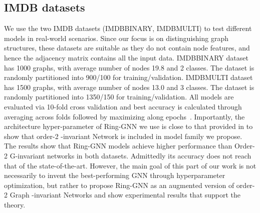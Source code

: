 \documentclass{article}
\begin{document}
\subsection{IMDB datasets} \label{sec.imbdb}
We use the two IMDB datasets (IMDBBINARY, IMDBMULTI) to test different models in real-world scenarios. Since our focus is on distinguishing graph structures, these datasets are suitable as they do not contain node features, and hence the adjacency matrix contains all the input data. IMDBBINARY dataset has 1000 graphs, with average number of nodes 19.8 and 2 classes. The dataset is randomly partitioned into 900/100 for training/validation. IMDBMULTI dataset has 1500 graphs, with average number of nodes 13.0 and 3 classes. The dataset is randomly partitioned into 1350/150 for training/validation. All models are evaluated via 10-fold cross validation and best accuracy is calculated through averaging across folds followed by maximizing along epochs~\cite{xu2018powerful}. Importantly, the architecture hyper-parameter of Ring-GNN we use is close to that provided in \cite{maron2018invariant} to show that order-2 -invariant Network is included in model family we propose. The results show that Ring-GNN models achieve higher performance than Order-2 G-invariant networks in both datasets. Admittedly its accuracy does not reach that of the state-of-the-art. 
However, the main goal of this part of our work is not necessarily to invent the best-performing GNN through hyperparameter optimization, but rather to propose Ring-GNN as an augmented version of order-2 Graph -invariant Networks and show experimental results that support the theory. 
\end{document}
